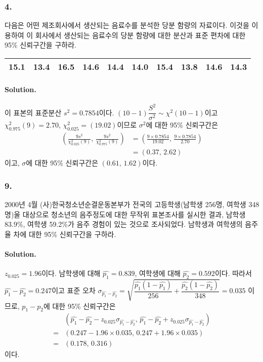 \subsubsection{4.} 다음은 어떤 제조회사에서 생산되는 음료수를 분석한 당분 함량의 자료이다. 이것을 이용하여 이 회사에서 생산되는 음료수의
당분 함량에 대한 분산과 표준 편차에 대한 95\% 신뢰구간을 구하라.

\begin{center}
    \begin{tabular}{cccccccccc}
        \hline
        15.1 & 13.4 & 16.5 & 14.6 & 14.4 & 14.0 & 15.4 & 13.8 & 14.6 & 14.3 \\
        \hline
    \end{tabular}
\end{center}

\paragraph{Solution.} 이 표본의 표준분산 $s^2=0.7854$이다. $\left(10-1\right)\dfrac{S^2}{\sigma^2} \sim \chi^2\left(10-1\right)$이고
$\chi_{0.975}^2\left(9\right)=2.70$, $\chi_{0.025}^2=\left(19.02\right)$이므로 $\sigma^2$에 대한 95\% 신뢰구간은
\begin{align*}
    \left(\frac{9s^2}{\chi_{0.025}^2\left(9\right)},\,\frac{9s^2}{\chi_{0.975}^2\left(9\right)}\right)
    &= \left(\frac{9\times0.7854}{19.02},\,\frac{9\times0.7854}{2.70}\right) \\
    &= \left(0.37,\,2.62\right)
\end{align*}
이고, $\sigma$에 대한 95\% 신뢰구간은 $\left(0.61,\,1.62\right)$이다.

\subsubsection{9.} 2000년 4월 (사)한국청소년순결운동본부가 전국의 고등학생(남학생 256명, 여학생 348명)울 대상으로
청소년의 음주정도에 대한 무작위 표본조사를 실시한 결과, 남학생 83.9\%, 여학생 59.2\%가 음주 경험이 있는 것으로 조사되었다. 남학생과
여학생의 음주율 차에 대한 95\% 신뢰구간을 구하라.

\paragraph{Solution.} $z_{0.025}=1.96$이다. 남학생에 대해 $\hat{p_1}=0.839$, 여학생에 대해 $\hat{p_2}=0.592$이다. 따라서 $\hat{p_1}-\hat{p_2}=0.247$이고
표준 오차 $\sigma_{\hat{p_1}-\hat{p_2}}=\sqrt{\dfrac{\hat{p_1}\left(1-\hat{p_1}\right)}{256}+\dfrac{\hat{p_2}\left(1-\hat{p_2}\right)}{348}}=0.035$
이므로, $p_1-p_2$에 대한 95\% 신뢰구간은
\begin{align*}
     & \left(\hat{p_1}-\hat{p_2}-z_{0.025}\sigma_{\hat{p_1}-\hat{p_2}},\,\hat{p_1}-\hat{p_2}+z_{0.025}\sigma_{\hat{p_1}-\hat{p_2}}\right) \\
    =& \left(0.247-1.96\times0.035,\,0.247+1.96\times0.035\right) \\
    =& \left(0.178,\,0.316\right)
\end{align*}
이다.

